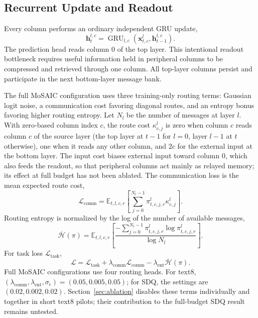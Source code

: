 \documentclass[letterpaper,twoside]{article}
\begin{document}
\subsection{Recurrent Update and Readout}

Every column performs an ordinary independent GRU update,
\begin{equation}
\mathbf{h}_t^{l,c} =
\operatorname{GRU}_{l,c}
(\mathbf{x}_{t,c}^l,\mathbf{h}_{t-1}^{l,c}).
\end{equation}
The prediction head reads column 0 of the top layer. This intentional readout bottleneck requires useful information held in peripheral columns to be compressed and retrieved through one column. All top-layer columns persist and participate in the next bottom-layer message bank.

The full MoSAIC configuration uses three training-only routing terms: Gaussian logit noise, a communication cost favoring diagonal routes, and an entropy bonus favoring higher routing entropy. Let $N_l$ be the number of messages at layer $l$. With zero-based column index $c$, the route cost $\kappa_{c,j}^l$ is zero when column $c$ reads column $c$ of the source layer (the top layer at $t-1$ for $l=0$, layer $l-1$ at $t$ otherwise), one when it reads any other column, and $2c$ for the external input at the bottom layer. The input cost biases external input toward column 0, which also feeds the readout, so that peripheral columns act mainly as relayed memory; its effect at full budget has not been ablated. The communication loss is the mean expected route cost,
\begin{equation}
\mathcal{L}_{\mathrm{comm}}
= \mathbb{E}_{t,l,c,r}\!\left[
\sum_{j=0}^{N_l-1}\pi_{t,c,j,r}^l \kappa_{c,j}^l
\right].
\end{equation}
Routing entropy is normalized by the log of the number of available messages,
\begin{equation}
\overline{\mathcal{H}}(\pi)
= \mathbb{E}_{t,l,c,r}\!\left[
\frac{-\sum_{j=0}^{N_l-1}\pi_{t,c,j,r}^l
\log \pi_{t,c,j,r}^l}{\log N_l}
\right].
\end{equation}
For task loss $\mathcal{L}_{\mathrm{task}}$,
\begin{equation}
\mathcal{L} =
\mathcal{L}_{\mathrm{task}}
+ \lambda_{\mathrm{comm}}\mathcal{L}_{\mathrm{comm}}
- \lambda_{\mathrm{ent}}\overline{\mathcal{H}}(\pi).
\end{equation}
Full MoSAIC configurations use four routing heads. For text8, $(\lambda_{\mathrm{comm}},\lambda_{\mathrm{ent}},\sigma_\epsilon)=(0.05,0.005,0.05)$; for SDQ, the settings are $(0.02,0.002,0.02)$. Section~\ref{sec:ablation} disables these terms individually and together in short text8 pilots; their contribution to the full-budget SDQ result remains untested.
\end{document}
